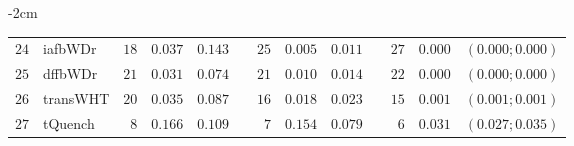 \begin{table*}[!htbp]
\begin{adjustwidth*}{}{-2cm}
\begin{tabular}{@{}rlrrrrrrrrrcc@{}}
\footnotesize{$24$} & \footnotesize{iafbWDr  } & \footnotesize{$18$} & \footnotesize{$0.037$} & \footnotesize{$0.143$} && \footnotesize{$25$} & \footnotesize{$0.005$} & \footnotesize{$0.011$} && \footnotesize{$27$} & \footnotesize{$0.000$} & \footnotesize{$(0.000;0.000)$} \\
\footnotesize{$25$} & \footnotesize{dffbWDr  } & \footnotesize{$21$} & \footnotesize{$0.031$} & \footnotesize{$0.074$} && \footnotesize{$21$} & \footnotesize{$0.010$} & \footnotesize{$0.014$} && \footnotesize{$22$} & \footnotesize{$0.000$} & \footnotesize{$(0.000;0.000)$} \\
\footnotesize{$26$} & \footnotesize{transWHT } & \footnotesize{$20$} & \footnotesize{$0.035$} & \footnotesize{$0.087$} && \footnotesize{$16$} & \footnotesize{$0.018$} & \footnotesize{$0.023$} && \footnotesize{$15$} & \footnotesize{$0.001$} & \footnotesize{$(0.001;0.001)$} \\
\footnotesize{$27$} & \footnotesize{tQuench  } & \footnotesize{$8 $} & \footnotesize{$0.166$} & \footnotesize{$0.109$} && \footnotesize{$7 $} & \footnotesize{$0.154$} & \footnotesize{$0.079$} && \footnotesize{$6 $} & \footnotesize{$0.031$} & \footnotesize{$(0.027;0.035)$} \\
\bottomrule
\end{tabular}
\end{adjustwidth*}
\end{table*}

